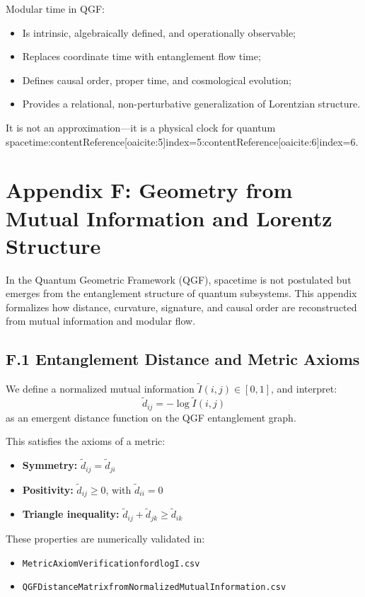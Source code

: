 \documentclass[11pt]{article}
\def\_{}
\begin{document}
Modular time in QGF:
\begin{itemize}
  \item Is intrinsic, algebraically defined, and operationally observable;
  \item Replaces coordinate time with entanglement flow time;
  \item Defines causal order, proper time, and cosmological evolution;
  \item Provides a relational, non-perturbative generalization of Lorentzian structure.
\end{itemize}
It is not an approximation—it is a physical clock for quantum spacetime:contentReference[oaicite:5]{index=5}:contentReference[oaicite:6]{index=6}.



\section*{Appendix F: Geometry from Mutual Information and Lorentz Structure}

In the Quantum Geometric Framework (QGF), spacetime is not postulated but emerges from the entanglement structure of quantum subsystems. This appendix formalizes how distance, curvature, signature, and causal order are reconstructed from mutual information and modular flow.

\subsection*{F.1 Entanglement Distance and Metric Axioms}

We define a normalized mutual information \( \tilde{I}(i,j) \in [0,1] \), and interpret:
\[
\tilde{d}_{ij} = -\log \tilde{I}(i,j)
\]
as an emergent distance function on the QGF entanglement graph.

This satisfies the axioms of a metric:
\begin{itemize}
  \item \textbf{Symmetry:} \( \tilde{d}_{ij} = \tilde{d}_{ji} \)
  \item \textbf{Positivity:} \( \tilde{d}_{ij} \geq 0 \), with \( \tilde{d}_{ii} = 0 \)
  \item \textbf{Triangle inequality:} \( \tilde{d}_{ij} + \tilde{d}_{jk} \geq \tilde{d}_{ik} \)
\end{itemize}

These properties are numerically validated in:
\begin{itemize}
  \item \texttt{Metric\_Axiom\_Verification\_for\_d\_\_log\_I\_\_.csv}
  \item \texttt{QGF\_Distance\_Matrix\_from\_Normalized\_Mutual\_Information.csv}
\end{itemize}
\end{document}
